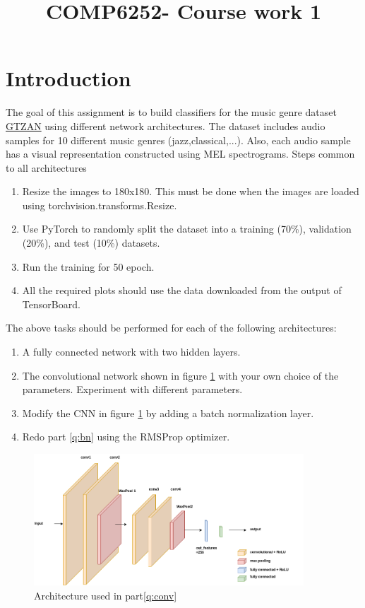 \documentclass{article}
\title{COMP6252- Course work 1}
\begin{document}
\maketitle
\section{Introduction}
The goal of this assignment is to build classifiers for the music genre dataset \href{https://www.kaggle.com/datasets/andradaolteanu/gtzan-dataset-music-genre-classification}{GTZAN} using different network architectures.
The dataset includes audio samples for 10 different music genres (jazz,classical,...). Also, each audio sample has a visual representation constructed using MEL spectrograms.
Steps common to all architectures
\begin{enumerate}
    \item Resize the images to 180x180. This must be done when the images are loaded using torchvision.transforms.Resize. 
    \item Use PyTorch to randomly split the dataset into a training  (70\%), validation (20\%), and test (10\%) datasets.
    \item Run the training for 50 epoch.
    \item All the required plots should use the data downloaded from the output of TensorBoard.
  
\end{enumerate}
The above tasks should be performed for each of the following architectures:
\begin{enumerate}[label=\Alph*]
    \item A fully connected network with two hidden layers\label{q:fc}.
    \item\label{q:conv} The convolutional network shown in figure \ref{fig:conv} with your own choice of the parameters. Experiment with different parameters.
    \item Modify the CNN in figure \ref{fig:conv} by adding a batch normalization layer\label{q:bn}.
    \item Redo part \ref{q:bn}\label{q:da} using the RMSProp optimizer.
    
\end{enumerate} 
\begin{figure}[h]
    \begin{center}
        \includegraphics[width=0.9\textwidth]{course-work-conv.png}
    \end{center}
    \caption{Architecture used in part\ref{q:conv}\label{fig:conv}    }
\end{figure}
\end{document}
